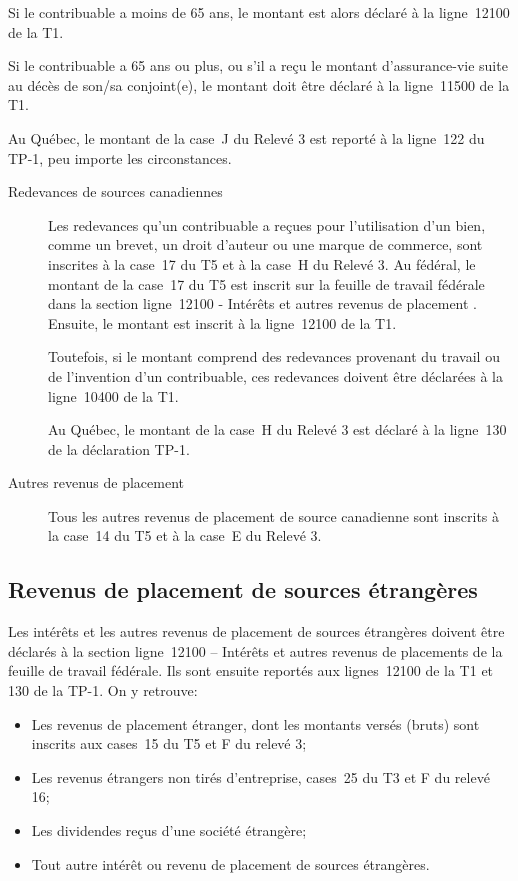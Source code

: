 Si le contribuable a moins de 65 ans, le montant est alors déclaré à la ligne~12100 de la T1. 

Si le contribuable a 65 ans ou plus, ou s'il a reçu le montant d'assurance-vie suite au décès de son/sa conjoint(e), le montant doit être déclaré à la ligne~11500 de la T1. 

Au Québec, le montant de la case~J du Relevé 3 est reporté à la ligne~122 du TP-1, peu importe les circonstances.
\begin{description}
	\item[Redevances de sources canadiennes] Les redevances qu'un contribuable a reçues pour l'utilisation d'un bien, comme un brevet, un droit d'auteur ou une marque de commerce, sont inscrites à la case~17 du T5 et à la case~H du Relevé 3. Au fédéral, le montant de la case~17 du T5 est inscrit sur la feuille de travail fédérale dans la section \og ligne~12100 - Intérêts et autres revenus de placement \fg{}. Ensuite, le montant est inscrit à la ligne~12100 de la T1.
	
	Toutefois, si le montant comprend des redevances provenant du travail ou de l'invention d'un contribuable, ces redevances doivent être déclarées à la ligne~10400 de la T1.
	
	Au Québec, le montant de la case~H du Relevé 3 est déclaré à la ligne~130 de la déclaration TP-1.
	\item[Autres revenus de placement] Tous les autres revenus de placement de source canadienne sont inscrits à la case~14 du T5 et à la case~E du Relevé 3.
\end{description}


\subsection{Revenus de placement de sources étrangères}
Les intérêts et les autres revenus de placement de sources étrangères doivent être déclarés à la section ligne~12100 – Intérêts et autres revenus de placements de la feuille de travail fédérale. Ils sont ensuite reportés aux lignes~12100 de la T1 et 130 de la TP-1. On y retrouve:
\begin{itemize}
	\item Les revenus de placement étranger, dont les montants versés (bruts) sont inscrits aux cases~15 du T5 et F du relevé 3;
	\item Les revenus étrangers non tirés d'entreprise, cases~25 du T3 et F du relevé 16;
	\item Les dividendes reçus d'une société étrangère;
	\item Tout autre intérêt ou revenu de placement de sources étrangères.
\end{itemize}

